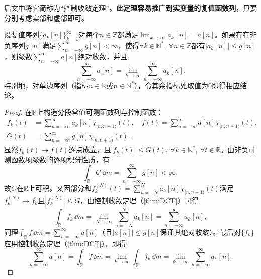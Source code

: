 后文中将它简称为“控制收敛定理”。\textbf{此定理容易推广到实变量的复值函数列}，只要分别考虑实部和虚部即可。

\begin{corollary}[离散控制收敛定理]\label{cor:discrete_DCT}
    设复值序列$\{a_k[n]\}_{k=1}^{\infty}$对每个$n\in\mathbb{Z}$都满足$\lim_{k\to\infty}a_k[n]=a[n]$。如果存在非负序列$g[n]$满足$\sum_{n=-\infty}^{\infty}g[n]<\infty$，使得$\forall k\in\mathbb{N}^*,\ \forall n\in\mathbb{Z}$都有$|a_k[n]|\leq g[n]$，则级数$\sum_{n=-\infty}^{\infty}a[n]$绝对收敛，并且
    \begin{equation}
        \sum_{n=-\infty}^{\infty}a[n]=\lim_{k\to\infty}\sum_{n=-\infty}^{\infty}a_k[n].
    \end{equation}
    特别地，对单边序列（指标$n\in\mathbb{N}$或$n\in\mathbb{N}^*$），令其余指标处取值为$0$即得相应结论。
\end{corollary}
\begin{proof}
    在$\mathbb{R}$上构造分段常值可测函数列与控制函数：
    \begin{align}
        f_k(t)&=\sum_{n=-\infty}^{\infty}a_k[n]\chi_{[n,n+1)}(t),\quad f(t)=\sum_{n=-\infty}^{\infty}a[n]\chi_{[n,n+1)}(t), \nonumber\\
        G(t)&=\sum_{n=-\infty}^{\infty}g[n]\chi_{[n,n+1)}(t).
    \end{align}
    显然$f_k(t)\to f(t)$逐点成立，且$|f_k(t)|\leq G(t),\ \forall k\in\mathbb{N}^*,\ \forall t\in\mathbb{R}$。由非负可测函数项级数的逐项积分性质，有
    \begin{equation}
        \int_{\mathbb{R}}G\,\dd m=\sum_{n=-\infty}^{\infty}g[n]<\infty,
    \end{equation}
    故$G$在$\mathbb{R}$上可积。又因部分和$f_k^{(N)}(t)=\sum_{n=-N}^{N}a_k[n]\chi_{[n,n+1)}(t)$满足$f_k^{(N)}\to f_k$且$|f_k^{(N)}|\leq G$，由控制收敛定理（\cref{thm:DCT}）可得
    \begin{equation}
        \int_{\mathbb{R}}f_k\,\dd m=\lim_{N\to\infty}\sum_{n=-N}^{N}a_k[n]=\sum_{n=-\infty}^{\infty}a_k[n],
    \end{equation}
    同理$\int_{\mathbb{R}}f\,\dd m=\sum_{n=-\infty}^{\infty}a[n]$（且$|a[n]|\leq g[n]$保证其绝对收敛）。最后对$\{f_k\}$应用控制收敛定理（\cref{thm:DCT}），即得
    \begin{equation}
        \sum_{n=-\infty}^{\infty}a[n]=\int_{\mathbb{R}}f\,\dd m=\lim_{k\to\infty}\int_{\mathbb{R}}f_k\,\dd m=\lim_{k\to\infty}\sum_{n=-\infty}^{\infty}a_k[n].
    \end{equation}
\end{proof}

